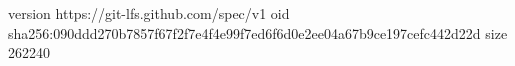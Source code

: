 version https://git-lfs.github.com/spec/v1
oid sha256:090ddd270b7857f67f2f7e4f4e99f7ed6f6d0e2ee04a67b9ce197cefc442d22d
size 262240
